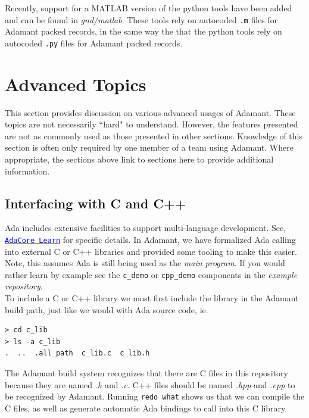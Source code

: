 Recently, support for a MATLAB version of the python tools have been added and can be found in \textit{gnd/matlab}. These tools rely on autocoded \texttt{.m} files for Adamant packed records, in the same way the that the python tools rely on autocoded \texttt{.py} files for Adamant packed records.

\newpage
\section{Advanced Topics}

This section provides discussion on various advanced usages of Adamant. These topics are not necessarily ``hard" to understand. However, the features presented are not as commonly used as those presented in other sections. Knowledge of this section is often only required by one member of a team using Adamant. Where appropriate, the sections above link to sections here to provide additional information.

\subsection{Interfacing with C and C++} \label{C Interfacing}

Ada includes extensive facilities to support multi-language development. See, \href{https://learn.adacore.com/courses/intro-to-embedded-sys-prog/chapters/multi_language_development.html}{\texttt{\textcolor{blue}{AdaCore Learn}}} for specific details. In Adamant, we have formalized Ada calling into external C or C++ libraries and provided some tooling to make this easier. Note, this assumes Ada is still being used as the \textit{main program}. If you would rather learn by example see the \texttt{c\_demo} or \texttt{cpp\_demo} components in the \textit{example repository}. \\

To include a C or C++ library we must first include the library in the Adamant build path, just like we would with Ada source code, ie.

\vspace{5mm} %
\begin{verbatim}
> cd c_lib
> ls -a c_lib
.  ..  .all_path  c_lib.c  c_lib.h
\end{verbatim}
\vspace{5mm} %

The Adamant build system recognizes that there are C files in this repository because they are named \textit{.h} and \textit{.c}. C++ files should be named \textit{.hpp} and \textit{.cpp} to be recognized by Adamant. Running \texttt{redo what} shows us that we can compile the C files, as well as generate automatic Ada bindings to call into this C library.


